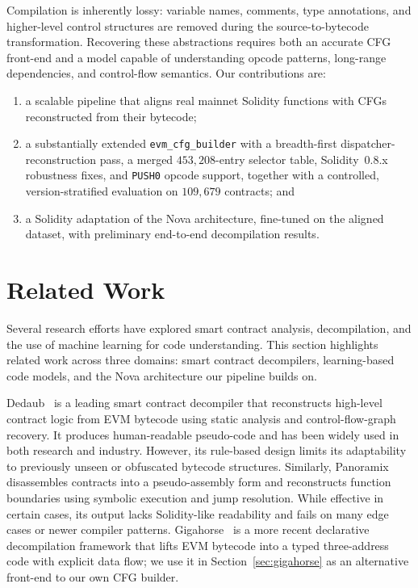 \documentclass{article}
\begin{document}
Compilation is inherently lossy: variable names, comments, type annotations, and
higher-level control structures are removed during the source-to-bytecode
transformation. Recovering these abstractions requires both an accurate CFG
front-end and a model capable of understanding opcode patterns, long-range
dependencies, and control-flow semantics. Our contributions are:

\begin{enumerate}
  \item a scalable pipeline that aligns real mainnet Solidity functions with CFGs
        reconstructed from their bytecode;
  \item a substantially extended \texttt{evm\_cfg\_builder} with a breadth-first
        dispatcher-reconstruction pass, a merged $453{,}208$-entry selector
        table, Solidity~0.8.x robustness fixes, and \texttt{PUSH0} opcode support,
        together with a controlled, version-stratified evaluation on $109{,}679$
        contracts; and
  \item a Solidity adaptation of the Nova architecture, fine-tuned on the aligned
        dataset, with preliminary end-to-end decompilation results.
\end{enumerate}

\section{Related Work}

Several research efforts have explored smart contract analysis, decompilation, and
the use of machine learning for code understanding. This section highlights
related work across three domains: smart contract decompilers, learning-based code
models, and the Nova architecture our pipeline builds on.

Dedaub~\cite{neville2023dedaub} is a leading smart contract decompiler that
reconstructs high-level contract logic from EVM bytecode using static analysis and
control-flow-graph recovery. It produces human-readable pseudo-code and has been
widely used in both research and industry. However, its rule-based design limits
its adaptability to previously unseen or obfuscated bytecode structures.
Similarly, Panoramix~\cite{panoramix} disassembles contracts into a
pseudo-assembly form and reconstructs function boundaries using symbolic execution
and jump resolution. While effective in certain cases, its output lacks
Solidity-like readability and fails on many edge cases or newer compiler patterns.
Gigahorse~\cite{grech2019gigahorse} is a more recent declarative decompilation
framework that lifts EVM bytecode into a typed three-address code with explicit
data flow; we use it in Section~\ref{sec:gigahorse} as an alternative front-end to
our own CFG builder.
\end{document}
